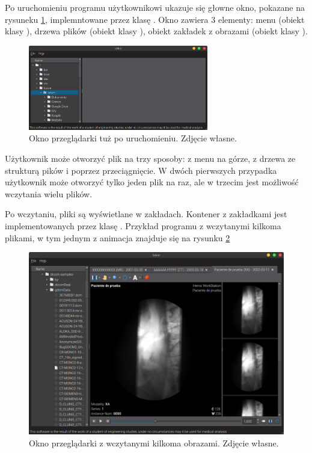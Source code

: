 \label{sec:sokar-gui}

\par
Po uruchomieniu programu użytkownikowi ukazuje się głowne okno, pokazane na rysuneku \ref{fig:sokar-gui-empty-window}, implemntowane przez klasę .
Okno zawiera 3 elementy: menu (obiekt klasy ), drzewa plików (obiekt klasy ), obiekt zakładek z obrazami (obiekt klasy ).

\begin{figure}[!htbp]
    \centering
    \includegraphics[width=0.7\textwidth]{img/sokar-gui-001.png}
    \caption{Okno przeglądarki tuż po uruchomieniu. Zdjęcie własne.}
    \label{fig:sokar-gui-empty-window}
\end{figure}

\par
Użytkownik może otworzyć plik \DICOM na trzy sposoby: z menu na górze, z drzewa ze strukturą pików i poprzez przeciągnięcie.
W dwóch pierwszych przypadka użytkownik może otworzyć tylko jeden plik na raz, ale w trzecim jest możliwość wczytania wielu plików.

\par
Po wczytaniu, pliki są wyświetlane w zakładach.
Kontener z zakładkami jest implementowanych przez klasę .
Przykład programu z wczytanymi kilkoma plikami, w tym jednym z animacja znajduje się na rysunku \ref{fig:sokar-gui-with-files}

\begin{figure}[!htbp]
    \centering
    \includegraphics[width=\textwidth]{img/sokar-gui-002.png}
    \caption{Okno przeglądarki z wczytanymi kilkoma obrazami. Zdjęcie własne.}
    \label{fig:sokar-gui-with-files}
\end{figure}

